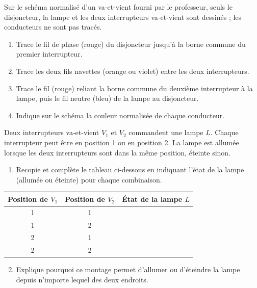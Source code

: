 \documentclass[11pt]{article}
\begin{document}
\begin{exercice}
Sur le schéma normalisé d'un va-et-vient fourni par le professeur, seuls le disjoncteur, la lampe et les deux interrupteurs va-et-vient sont dessinés ; les conducteurs ne sont pas tracés.
\begin{enumerate}
\item Trace le fil de phase (rouge) du disjoncteur jusqu'à la borne commune du premier interrupteur.
\item Trace les deux fils navettes (orange ou violet) entre les deux interrupteurs.
\item Trace le fil (rouge) reliant la borne commune du deuxième interrupteur à la lampe, puis le fil neutre (bleu) de la lampe au disjoncteur.
\item Indique sur le schéma la couleur normalisée de chaque conducteur.
\end{enumerate}
\end{exercice}

\begin{exercice}
Deux interrupteurs va-et-vient $V_1$ et $V_2$ commandent une lampe $L$. Chaque interrupteur peut être en position 1 ou en position 2. La lampe est allumée lorsque les deux interrupteurs sont dans la même position, éteinte sinon.
\begin{enumerate}
\item Recopie et complète le tableau ci-dessous en indiquant l'état de la lampe (allumée ou éteinte) pour chaque combinaison.
\end{enumerate}
\begin{center}
\begin{tabular}{|c|c|c|}
\hline
\rowcolor{popblueL} Position de $V_1$ & Position de $V_2$ & État de la lampe $L$ \\
\hline
1 & 1 & \\
\hline
1 & 2 & \\
\hline
2 & 1 & \\
\hline
2 & 2 & \\
\hline
\end{tabular}
\end{center}
\begin{enumerate}
\setcounter{enumi}{1}
\item Explique pourquoi ce montage permet d'allumer ou d'éteindre la lampe depuis n'importe lequel des deux endroits.
\end{enumerate}
\end{exercice}
\end{document}
